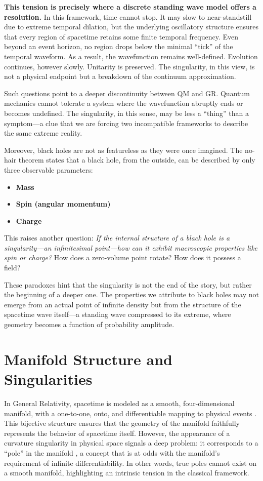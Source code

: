 \documentclass[12pt]{article}
\begin{document}
\textbf{This tension is precisely where a discrete standing wave model offers a resolution.} In this framework, time cannot stop. It may slow to near-standstill due to extreme temporal dilation, but the underlying oscillatory structure ensures that every region of spacetime retains some finite temporal frequency. Even beyond an event horizon, no region drops below the minimal “tick” of the temporal waveform. As a result, the wavefunction remains well-defined. Evolution continues, however slowly. Unitarity is preserved. The singularity, in this view, is not a physical endpoint but a breakdown of the continuum approximation.

Such questions point to a deeper discontinuity between QM and GR. Quantum mechanics cannot tolerate a system where the wavefunction abruptly ends or becomes undefined. The singularity, in this sense, may be less a ``thing'' than a symptom---a clue that we are forcing two incompatible frameworks to describe the same extreme reality.

Moreover, black holes are not as featureless as they were once imagined. The no-hair theorem \citep{wikipedia_no_hair_theorem} states that a black hole, from the outside, can be described by only three observable parameters:
\begin{itemize}
    \item \textbf{Mass}
    \item \textbf{Spin (angular momentum)}
    \item \textbf{Charge}
\end{itemize}

\newpage
This raises another question: \textit{If the internal structure of a black hole is a singularity---an infinitesimal point---how can it exhibit macroscopic properties like spin or charge?} How does a zero-volume point rotate? How does it possess a field?

These paradoxes hint that the singularity is not the end of the story, but rather the beginning of a deeper one. The properties we attribute to black holes may not emerge from an actual point of infinite density but from the structure of the spacetime wave itself---a standing wave compressed to its extreme, where geometry becomes a function of probability amplitude.


\section{Manifold Structure and Singularities}

In General Relativity, spacetime is modeled as a smooth, four-dimensional manifold, with a one-to-one, onto, and differentiable mapping to physical events \citep{waldGR1984}. This bijective structure ensures that the geometry of the manifold faithfully represents the behavior of spacetime itself. However, the appearance of a curvature singularity in physical space signals a deep problem: it corresponds to a “pole” in the manifold \citep{schwarzschild1916}, a concept that is at odds with the manifold’s requirement of infinite differentiability. In other words, true poles cannot exist on a smooth manifold, highlighting an intrinsic tension in the classical framework.
\end{document}
